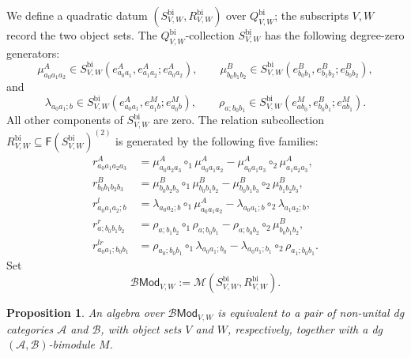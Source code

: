 \documentclass[11pt,letterpaper]{article}
\numberwithin{equation}{section}
\theoremstyle{plain}
\newtheorem{prop}[thm]{Proposition}
\theoremstyle{definition}
\theoremstyle{remark}
\begin{document}
	We define a quadratic datum
	$(S^{\mathrm{bi}}_{V,W},R^{\mathrm{bi}}_{V,W})$ over
	$Q^{\mathrm{bi}}_{V,W}$; the subscripts $V,W$ record the two object sets.
	The $Q^{\mathrm{bi}}_{V,W}$-collection $S^{\mathrm{bi}}_{V,W}$ has the
	following degree-zero generators:
	\[
	\mu^A_{a_0a_1a_2}
	\in
	S^{\mathrm{bi}}_{V,W}
	(e^A_{a_0a_1},e^A_{a_1a_2};e^A_{a_0a_2}),
	\qquad
	\mu^B_{b_0b_1b_2}
	\in
	S^{\mathrm{bi}}_{V,W}
	(e^B_{b_0b_1},e^B_{b_1b_2};e^B_{b_0b_2}),
	\]
	and
	\[
	\lambda_{a_0a_1;b}
	\in
	S^{\mathrm{bi}}_{V,W}
	(e^A_{a_0a_1},e^M_{a_1b};e^M_{a_0b}),
	\qquad
	\rho_{a;b_0b_1}
	\in
	S^{\mathrm{bi}}_{V,W}
	(e^M_{ab_0},e^B_{b_0b_1};e^M_{ab_1}).
	\]
	All other components of $S^{\mathrm{bi}}_{V,W}$ are zero. The relation
	subcollection $R^{\mathrm{bi}}_{V,W}\subseteq
	\mathsf F(S^{\mathrm{bi}}_{V,W})^{(2)}$ is generated by the following
	five families:
	\begin{equation*}
		\begin{aligned}
			r^A_{a_0a_1a_2a_3}
			&=
			\mu^A_{a_0a_2a_3}\circ_1\mu^A_{a_0a_1a_2}
			-
			\mu^A_{a_0a_1a_3}\circ_2\mu^A_{a_1a_2a_3},
			\\
			r^B_{b_0b_1b_2b_3}
			&=
			\mu^B_{b_0b_2b_3}\circ_1\mu^B_{b_0b_1b_2}
			-
			\mu^B_{b_0b_1b_3}\circ_2\mu^B_{b_1b_2b_3},
			\\
			r^l_{a_0a_1a_2;b}
			&=
			\lambda_{a_0a_2;b}\circ_1\mu^A_{a_0a_1a_2}
			-
			\lambda_{a_0a_1;b}\circ_2\lambda_{a_1a_2;b},
			\\
			r^r_{a;b_0b_1b_2}
			&=
			\rho_{a;b_1b_2}\circ_1\rho_{a;b_0b_1}
			-
			\rho_{a;b_0b_2}\circ_2\mu^B_{b_0b_1b_2},
			\\
			r^{lr}_{a_0a_1;b_0b_1}
			&=
			\rho_{a_0;b_0b_1}\circ_1\lambda_{a_0a_1;b_0}
			-
			\lambda_{a_0a_1;b_1}\circ_2\rho_{a_1;b_0b_1}.
		\end{aligned}
	\end{equation*}
	Set
	\begin{equation}
		\label{eq_dg_category_bimodule_operad}
		\mathscr B\mathsf{Mod}_{V,W}
		:=
		\mathscr M(S^{\mathrm{bi}}_{V,W},R^{\mathrm{bi}}_{V,W}).
	\end{equation}

	\begin{prop}
		\label{prop_dg_category_bimodule_algebras}
		An algebra over $\mathscr B\mathsf{Mod}_{V,W}$ is equivalent to a pair of
		non-unital dg categories $\mathcal A$ and $\mathcal B$, with object sets
		$V$ and $W$, respectively, together with a dg
		$(\mathcal A,\mathcal B)$-bimodule $M$.
	\end{prop}
\end{document}

